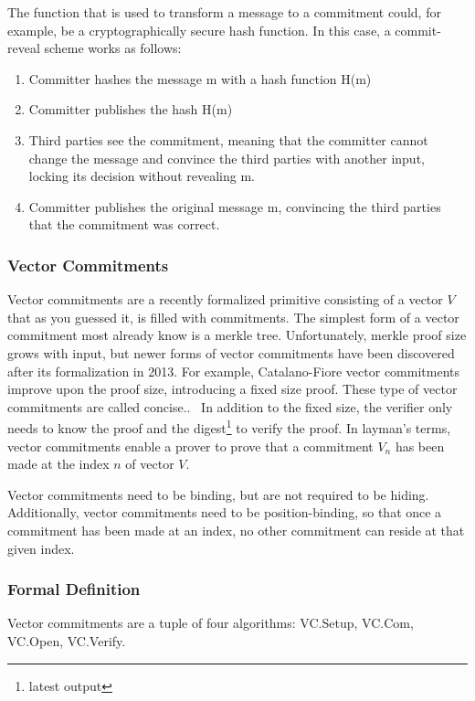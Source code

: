 The function that is used to transform a message to a commitment could, for example, be a cryptographically secure hash function. In this case, a commit-reveal scheme works as follows:

\begin{enumerate}
  \item Committer hashes the message m with a hash function H(m)
  \item Committer publishes the hash H(m)
  \item Third parties see the commitment, meaning that the committer cannot change the message and convince the third parties with another input, locking its decision without revealing m.
  \item Committer publishes the original message m, convincing the third parties that the commitment was correct.
\end{enumerate}


\subsubsection{Vector Commitments}
Vector commitments are a recently formalized primitive consisting of a vector \(V\) that as you guessed it, is filled with commitments. The simplest form of a vector commitment most already know is a merkle tree. Unfortunately, merkle proof size grows with input, but newer forms of vector commitments have been discovered after its formalization in 2013. For example, Catalano-Fiore vector commitments improve upon the proof size, introducing a fixed size proof. These type of vector commitments are called concise..~\cite{Catalano2013-jn} In addition to the fixed size, the verifier only needs to know the proof and the digest\footnote{latest output} to verify the proof. In layman's terms, vector commitments enable a prover to prove that a commitment \(V_n\) has been made at the index \(n\) of vector \(V\).

Vector commitments need to be binding, but are not required to be hiding. Additionally, vector commitments need to be position-binding, so that once a commitment has been made at an index, no other commitment can reside at that given index.

\subsubsection{Formal Definition}
Vector commitments are a tuple of four algorithms: VC.Setup, VC.Com, VC.Open, VC.Verify.~\cite{Boneh2019-tk}

